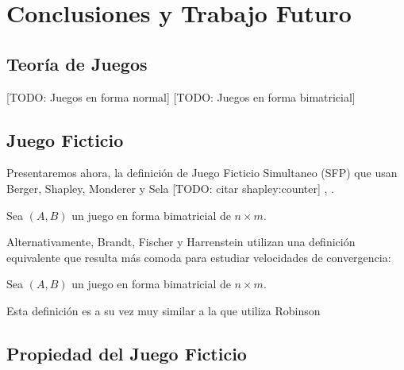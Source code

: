 \chapter{Conclusiones y Trabajo Futuro}  \label{cap1}

\section{Teoría de Juegos}
[TODO: Juegos en forma normal]
[TODO: Juegos en forma bimatricial]

\section{Juego Ficticio}
Presentaremos ahora, la definición de Juego Ficticio Simultaneo (SFP) que usan Berger, Shapley, Monderer y Sela
\cite{browns:original} \cite{strategic:complementarities} [TODO: citar shapley:counter] \cite{no:cycling}, \cite{identical:interests}.


\begin{definition}
    Sea $(A, B)$ un juego en forma bimatricial de $n \times m$.
\end{definition}

Alternativamente, Brandt, Fischer y Harrenstein utilizan una definición equivalente que resulta más comoda para estudiar velocidades
de convergencia:

\begin{definition}
    Sea $(A, B)$ un juego en forma bimatricial de $n \times m$.
\end{definition}

Esta definición es a su vez muy similar a la que utiliza Robinson \cite{robinson:zerosum}
\section{Propiedad del Juego Ficticio}